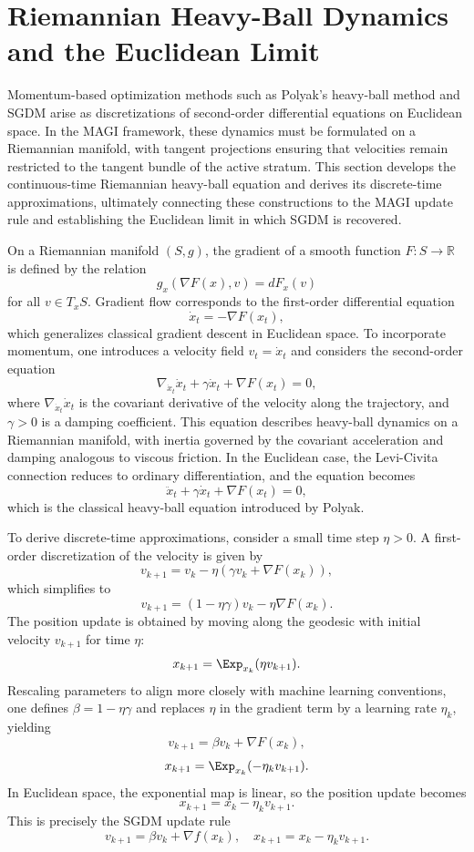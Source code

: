 \documentclass[12pt]{article}
\begin{document}
\section{Riemannian Heavy-Ball Dynamics and the Euclidean Limit}

Momentum-based optimization methods such as Polyak’s heavy-ball method and SGDM arise as discretizations of second-order differential equations on Euclidean space. In the MAGI framework, these dynamics must be formulated on a Riemannian manifold, with tangent projections ensuring that velocities remain restricted to the tangent bundle of the active stratum. This section develops the continuous-time Riemannian heavy-ball equation and derives its discrete-time approximations, ultimately connecting these constructions to the MAGI update rule and establishing the Euclidean limit in which SGDM is recovered.

On a Riemannian manifold $(S, g)$, the gradient of a smooth function $F : S \to \mathbb{R}$ is defined by the relation
\[
g_x(\nabla F(x), v) = dF_x(v)
\]
for all $v \in T_x S$. Gradient flow corresponds to the first-order differential equation
\[
\dot{x}_t = -\nabla F(x_t),
\]
which generalizes classical gradient descent in Euclidean space. To incorporate momentum, one introduces a velocity field $v_t = \dot{x}_t$ and considers the second-order equation
\[
\nabla_{\dot{x}_t} \dot{x}_t + \gamma \dot{x}_t + \nabla F(x_t) = 0,
\]
where $\nabla_{\dot{x}_t} \dot{x}_t$ is the covariant derivative of the velocity along the trajectory, and $\gamma > 0$ is a damping coefficient. This equation describes heavy-ball dynamics on a Riemannian manifold, with inertia governed by the covariant acceleration and damping analogous to viscous friction. In the Euclidean case, the Levi-Civita connection reduces to ordinary differentiation, and the equation becomes
\[
\ddot{x}_t + \gamma \dot{x}_t + \nabla F(x_t) = 0,
\]
which is the classical heavy-ball equation introduced by Polyak.

To derive discrete-time approximations, consider a small time step $\eta > 0$. A first-order discretization of the velocity is given by
\[
v_{k+1} = v_k - \eta \left( \gamma v_k + \nabla F(x_k) \right),
\]
which simplifies to
\[
v_{k+1} = (1 - \eta \gamma) v_k - \eta \nabla F(x_k).
\]
The position update is obtained by moving along the geodesic with initial velocity $v_{k+1}$ for time $\eta$:
\[
x_{k+1} = \Exp_{x_k}(\eta v_{k+1}).
\]
Rescaling parameters to align more closely with machine learning conventions, one defines $\beta = 1 - \eta \gamma$ and replaces $\eta$ in the gradient term by a learning rate $\eta_k$, yielding
\[
v_{k+1} = \beta v_k + \nabla F(x_k),
\]
\[
x_{k+1} = \Exp_{x_k}(-\eta_k v_{k+1}).
\]
In Euclidean space, the exponential map is linear, so the position update becomes
\[
x_{k+1} = x_k - \eta_k v_{k+1}.
\]
This is precisely the SGDM update rule
\[
v_{k+1} = \beta v_k + \nabla f(x_k), \quad x_{k+1} = x_k - \eta_k v_{k+1}.
\]
\end{document}
